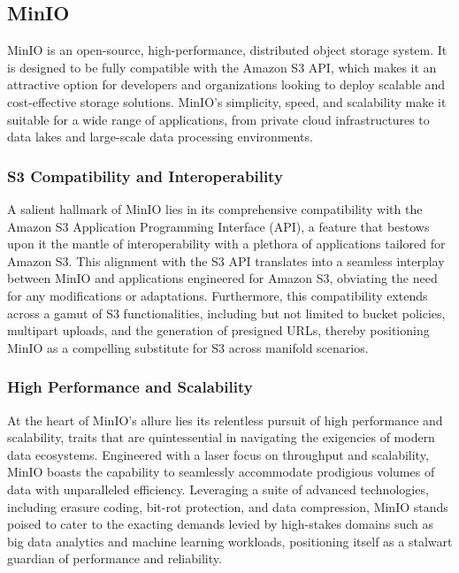
\subsection{MinIO}
MinIO is an open-source, high-performance, distributed object storage system. It
is designed to be fully compatible with the Amazon S3 API, which makes it an
attractive option for developers and organizations looking to deploy scalable
and cost-effective storage solutions. MinIO's simplicity, speed, and scalability
make it suitable for a wide range of applications, from private cloud
infrastructures to data lakes and large-scale data processing environments.

\subsubsection*{S3 Compatibility and Interoperability}
A salient hallmark of MinIO lies in its comprehensive compatibility with the
Amazon S3 Application Programming Interface (API), a feature that bestows upon
it the mantle of interoperability with a plethora of applications tailored for
Amazon S3. This alignment with the S3 API translates into a seamless interplay
between MinIO and applications engineered for Amazon S3, obviating the need for
any modifications or adaptations. Furthermore, this compatibility extends across
a gamut of S3 functionalities, including but not limited to bucket policies,
multipart uploads, and the generation of presigned URLs, thereby positioning
MinIO as a compelling substitute for S3 across manifold scenarios.

\subsubsection*{High Performance and Scalability}
At the heart of MinIO's allure lies its relentless pursuit of high performance
and scalability, traits that are quintessential in navigating the exigencies of
modern data ecosystems. Engineered with a laser focus on throughput and
scalability, MinIO boasts the capability to seamlessly accommodate prodigious
volumes of data with unparalleled efficiency. Leveraging a suite of advanced
technologies, including erasure coding, bit-rot protection, and data
compression, MinIO stands poised to cater to the exacting demands levied by
high-stakes domains such as big data analytics and machine learning workloads,
positioning itself as a stalwart guardian of performance and reliability.

